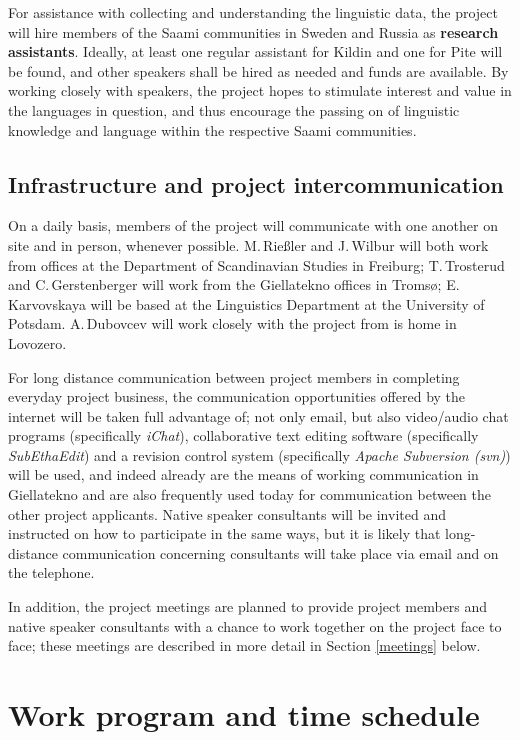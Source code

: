 \documentclass[a4paper,12pt]{article}
\begin{document}
{{{{For assistance with collecting and understanding the linguistic data, the project will hire members of the Saami communities in Sweden and Russia as \textbf{research assistants}. %
Ideally, at least one regular assistant for Kildin and one for Pite will be found, and other speakers shall be hired as needed and funds are available. By working closely with speakers, the project hopes to stimulate interest and value in the languages in question, and thus encourage the passing on of linguistic knowledge and language within the respective Saami communities.

\subsection{Infrastructure and project intercommunication}
On a daily basis, members of the project will communicate with one another on site and in person, whenever possible. M.\,Rießler and J.\,Wilbur will both work from offices at the Department of Scandinavian Studies in Freiburg; T.\,Trosterud and C.\,Gerstenberger will work from the Giellatekno offices in Tromsø; E.\,Karvovskaya will be based at the Linguistics Department at the University of Potsdam. A.\,Dubovcev will work closely with the project from is home in Lovozero.

For long distance communication between project members in completing everyday project business, the communication opportunities offered by the internet will be taken full advantage of; not only email, but also video/audio chat programs (specifically \textit{iChat}), collaborative text editing software (specifically \textit{SubEthaEdit}) and a revision control system (specifically \textit{Apache Subversion (svn)}) will be used, and indeed already are the means of working communication in Giellatekno and are also frequently used today for communication between the other project applicants. Native speaker consultants will be invited and instructed on how to participate in the same ways, but it is likely that long-distance communication concerning consultants will take place via email and on the telephone.

In addition, the project meetings are planned to provide project members and native speaker consultants with a chance to work together on the project face to face; these meetings are described in more detail in Section \ref{meetings} below.

\section{Work program and time schedule}
}}}}
\end{document}
